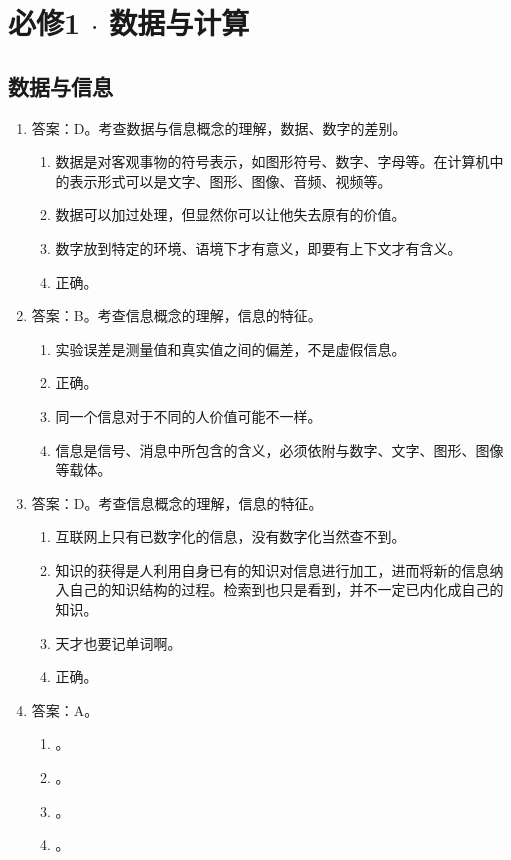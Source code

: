 \chapter{必修1 $\cdot$ 数据与计算}
\section{数据与信息}

\begin{enumerate}
\item 答案：D。考查数据与信息概念的理解，数据、数字的差别。
	\begin{enumerate}[label=\Alph*.]
	\item 数据是对客观事物的符号表示，如图形符号、数字、字母等。在计算机中的表示形式可以是文字、图形、图像、音频、视频等。
	\item 数据可以加过处理，但显然你可以让他失去原有的价值。
	\item 数字放到特定的环境、语境下才有意义，即要有上下文才有含义。
	\item 正确。
	\end{enumerate}

\item 答案：B。考查信息概念的理解，信息的特征。
	\begin{enumerate}[label=\Alph*.]
	\item 实验误差是测量值和真实值之间的偏差，不是虚假信息。
	\item 正确。
	\item 同一个信息对于不同的人价值可能不一样。
	\item 信息是信号、消息中所包含的含义，必须依附与数字、文字、图形、图像等载体。
	\end{enumerate}

\item 答案：D。考查信息概念的理解，信息的特征。
	\begin{enumerate}[label=\Alph*.]
	\item 互联网上只有已数字化的信息，没有数字化当然查不到。
	\item 知识的获得是人利用自身已有的知识对信息进行加工，进而将新的信息纳入自己的知识结构的过程。检索到也只是看到，并不一定已内化成自己的知识。
	\item 天才也要记单词啊。
	\item 正确。
	\end{enumerate}

\item 答案：A。
	\begin{enumerate}[label=\Alph*.]
	\item 。
	\item 。
	\item 。
	\item 。
	\end{enumerate}


\end{enumerate}
